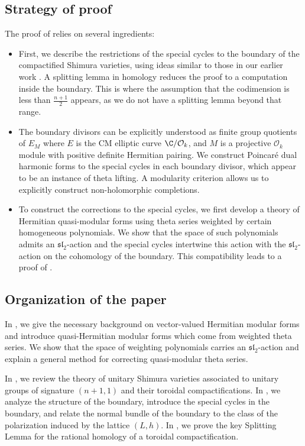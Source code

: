 \documentclass[11pt,letterpaper,english]{amsart}
\numberwithin{equation}{subsection}
\numberwithin{equation}{section}
\newcommand\cO{{\mathcal O}}
\theoremstyle{plain}
\theoremstyle{remark}
\begin{document}
\subsection{Strategy of proof}
The proof of  relies on several ingredients: 
\begin{itemize}
    \item First, we describe the restrictions of the special cycles to the boundary of the compactified Shimura varieties, using ideas similar to those in our earlier work \cite{engel-greer-tayou}. A splitting lemma in homology reduces the proof to a computation inside the boundary. This is where the assumption that the codimension is less than $\frac{n+1}{2}$ appears, as we do not have a splitting lemma beyond that range. 
    \item The boundary divisors can be explicitly understood as finite group quotients of $E_M$ where $E$ is the CM elliptic curve $\C/\cO_k$, and $M$ is a projective $\mathcal{O}_k$ module with positive definite Hermitian pairing. We construct Poincar\'{e} dual harmonic forms to the special cycles in each boundary divisor, which appear to be an instance of theta lifting. A modularity criterion allows us to explicitly construct non-holomorphic completions.
    
    \item  To construct the corrections to the special cycles, we first develop a theory of Hermitian quasi-modular forms using theta series weighted by certain homogeneous polynomials. We show that the space of such polynomials admits an $\mathfrak{sl}_2$-action and the special cycles intertwine this action with the $\mathfrak{sl}_2$-action on the cohomology of the boundary. This compatibility leads to a proof of .
\end{itemize}
\subsection{Organization of the paper}
In , we give the necessary background on vector-valued Hermitian modular forms and introduce quasi-Hermitian modular forms which come from weighted theta series. We show that the space of weighting polynomials carries an $\mathfrak{sl}_2$-action and explain a general method for correcting quasi-modular theta series.

In , we review the theory of unitary Shimura varieties associated to unitary groups of signature $(n+1,1)$ and their toroidal compactifications. In , we analyze the structure of the boundary, introduce the special cycles in the boundary, and relate the normal bundle of the boundary to the class of the polarization induced by the lattice $(L,h)$. In , we prove the key Splitting Lemma for the rational homology of a toroidal compactification.  
\end{document}

